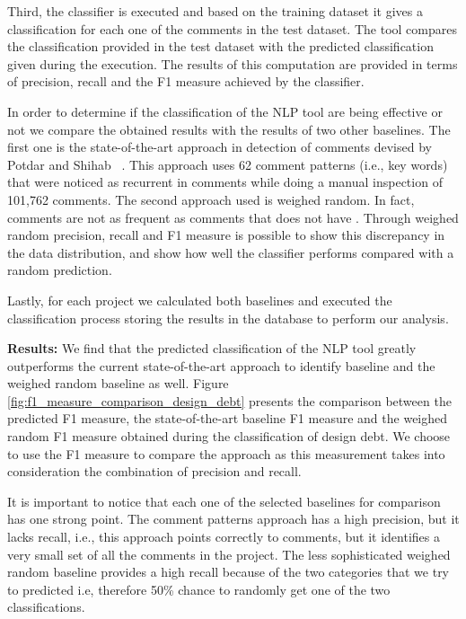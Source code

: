 Third, the classifier is executed and based on the training dataset it gives a classification for each one of the comments in the test dataset. The tool compares the classification provided in the test dataset with the predicted classification given during the execution. The results of this computation are provided in terms of precision, recall and the F1 measure achieved by the classifier.

In order to determine if the classification of the NLP tool are being effective or not we compare the obtained results with the results of two other baselines. The first one is the state-of-the-art approach in detection of \SATD comments devised by Potdar and Shihab ~\cite{Potdar2014ICSME}. This approach uses 62 comment patterns (i.e., key words) that were noticed as recurrent in \SATD comments while doing a manual inspection of 101,762 comments. The second approach used is weighed random. In fact, \SATD comments are not as frequent as comments that does not have \SATD. Through weighed random precision, recall and F1 measure is possible to show this discrepancy in the data distribution, and show how well the classifier performs compared with a random prediction.

Lastly, for each project we calculated both baselines and executed the classification process storing the results in the database to perform our analysis.

\vspace{1mm}

\noindent \textbf{Results:} We find that the predicted classification of the NLP tool greatly outperforms the current state-of-the-art approach to identify \SATD baseline and the weighed random baseline as well. Figure \ref{fig:f1_measure_comparison_design_debt} presents the comparison between the predicted F1 measure, the state-of-the-art baseline F1 measure and the weighed random F1 measure obtained during the classification of design debt. We choose to use the F1 measure to compare the approach as this measurement takes into consideration the combination of precision and recall.

It is important to notice that each one of the selected baselines for comparison has one strong point. The comment patterns approach has a high precision, but it lacks recall, i.e., this approach points correctly to \SATD comments, but it identifies a very small set of all the \SATD comments in the project. The less sophisticated weighed random baseline provides a high recall because of the two categories that we try to predicted i.e, therefore 50\% chance to randomly get one of the two classifications. 

